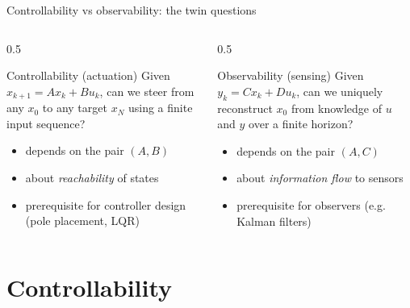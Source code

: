 \documentclass[aspectratio=169,10pt]{beamer}
\begin{document}
\begin{frame}{Controllability vs observability: the twin questions}
\begin{columns}[T,totalwidth=\textwidth]
\begin{column}{0.5\textwidth}
\begin{defnbox}{Controllability (actuation)}
Given \(x_{k+1}=Ax_k+Bu_k\), can we steer from any \(x_0\) to any target \(x_N\) using a finite input sequence?
\end{defnbox}
\vspace{0.3em}
\begin{itemize}
  \item depends on the pair \((A,B)\)
  \item about \emph{reachability} of states
  \item prerequisite for controller design (pole placement, LQR)
\end{itemize}
\end{column}
\begin{column}{0.5\textwidth}
\begin{defnbox}{Observability (sensing)}
Given \(y_k=Cx_k+Du_k\), can we uniquely reconstruct \(x_0\) from knowledge of \(u\) and \(y\) over a finite horizon?
\end{defnbox}
\vspace{0.3em}
\begin{itemize}
  \item depends on the pair \((A,C)\)
  \item about \emph{information flow} to sensors
  \item prerequisite for observers (e.g. Kalman filters)
\end{itemize}
\end{column}
\end{columns}
\end{frame}

\section{Controllability}
\end{document}
